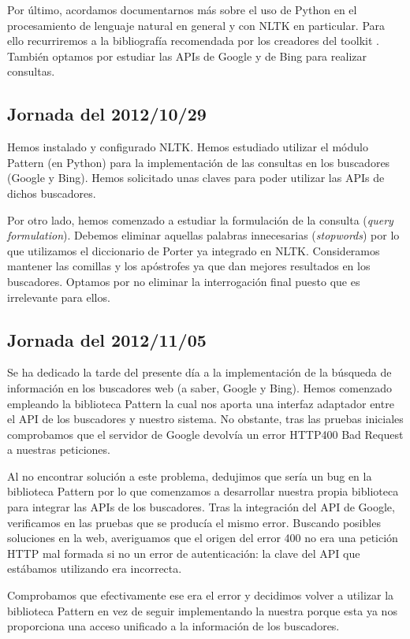 \documentclass[12pt,a4paper,titlepage]{article}
\begin{document}
Por último, acordamos documentarnos más sobre el uso de Python en el procesamiento de lenguaje natural en general y con NLTK en particular. Para ello recurriremos a la bibliografía recomendada por los creadores del toolkit \cite{nltk-book}. También optamos por estudiar las APIs de Google y de Bing para realizar consultas.

\subsection{Jornada del 2012/10/29}
Hemos instalado y configurado NLTK. Hemos estudiado utilizar el módulo Pattern (en Python) para la implementación de las consultas en los buscadores (Google y Bing). Hemos solicitado unas claves para poder utilizar las APIs de dichos buscadores.

Por otro lado, hemos comenzado a estudiar la formulación de la consulta (\emph{query formulation}). Debemos eliminar aquellas palabras innecesarias (\emph{stopwords}) por lo que utilizamos el diccionario de Porter ya integrado en NLTK. Consideramos mantener las comillas y los apóstrofes ya que dan mejores resultados en los buscadores. Optamos por no eliminar la interrogación final puesto que es irrelevante para ellos.

\subsection{Jornada del 2012/11/05}
Se ha dedicado la tarde del presente día a la implementación de la búsqueda de información en los buscadores web (a saber, Google y Bing). Hemos comenzado empleando la biblioteca Pattern\cite{pattern} la cual nos aporta una interfaz adaptador entre el API de los buscadores y nuestro sistema. No obstante, tras las pruebas iniciales comprobamos que el servidor de Google devolvía un error HTTP400 Bad Request a nuestras peticiones.

Al no encontrar solución a este problema, dedujimos que sería un bug en la biblioteca Pattern por lo que comenzamos a desarrollar nuestra propia biblioteca para integrar las APIs de los buscadores. Tras la integración del API de Google, verificamos en las pruebas que se producía el mismo error. Buscando posibles soluciones en la web, averiguamos que el origen del error 400 no era una petición HTTP mal formada si no un error de autenticación: la clave del API que estábamos utilizando era incorrecta.

Comprobamos que efectivamente ese era el error y decidimos volver a utilizar la biblioteca Pattern en vez de seguir implementando la nuestra porque esta ya nos proporciona una acceso unificado a la información de los buscadores.
\end{document}
